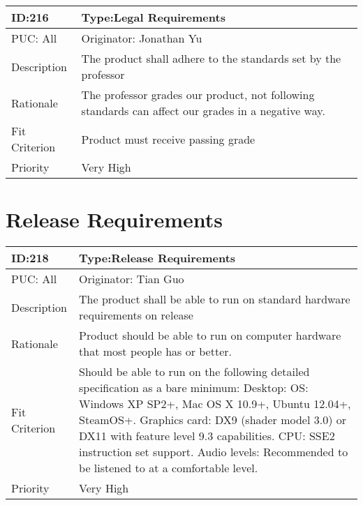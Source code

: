 \documentclass{article}
\begin{document}
	\begin{table}[H]
		\begin{tabular}{|l|l|l|}
			\hline
			ID:216 & \multicolumn{2}{l|}{Type:Legal Requirements} \\ \hline
			PUC: All & \multicolumn{2}{l|}{Originator: Jonathan Yu} \\ \hline
			Description & \multicolumn{2}{m{0.85\textwidth}|}{The product shall adhere to the standards set by the professor} \\ \hline
			Rationale & \multicolumn{2}{m{0.85\textwidth}|}{The professor grades our product, not following standards can affect our grades in a negative way.} \\ \hline
			Fit Criterion & \multicolumn{2}{m{0.85\textwidth}|}{Product must receive passing grade} \\ \hline
			Priority& \multicolumn{2}{m{0.85\textwidth}|}{Very High} \\ \hline
		\end{tabular}
	\end{table}



	
	\section{Release Requirements}

	\begin{table}[H]
		\begin{tabular}{|l|l|l|}
			\hline
			ID:218 & \multicolumn{2}{l|}{Type:Release Requirements} \\ \hline
			PUC: All & \multicolumn{2}{l|}{Originator: Tian Guo} \\ \hline
			Description & \multicolumn{2}{m{0.85\textwidth}|}{The product shall be able to run on standard hardware requirements on release} \\ \hline
			Rationale & \multicolumn{2}{m{0.85\textwidth}|}{Product should be able to run on computer hardware that most people has or better.} \\ \hline
			Fit Criterion & \multicolumn{2}{m{0.85\textwidth}|}{Should be able to run on the following detailed specification as a bare minimum: Desktop: OS: Windows XP SP2+, Mac OS X 10.9+, Ubuntu 12.04+, SteamOS+. Graphics card: DX9 (shader model 3.0) or DX11 with feature level 9.3 capabilities. CPU: SSE2 instruction set support. Audio levels: Recommended to be listened to at a comfortable level.} \\ \hline
			Priority& \multicolumn{2}{m{0.85\textwidth}|}{Very High} \\ \hline
		\end{tabular}
	\end{table}
	
\end{document}
